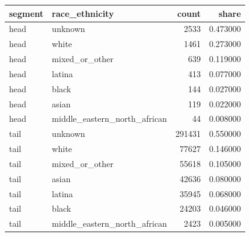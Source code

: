 \begin{tabular}{llrr}
\toprule
segment & race_ethnicity & count & share \\
\midrule
head & unknown & 2533 & 0.473000 \\
head & white & 1461 & 0.273000 \\
head & mixed_or_other & 639 & 0.119000 \\
head & latina & 413 & 0.077000 \\
head & black & 144 & 0.027000 \\
head & asian & 119 & 0.022000 \\
head & middle_eastern_north_african & 44 & 0.008000 \\
tail & unknown & 291431 & 0.550000 \\
tail & white & 77627 & 0.146000 \\
tail & mixed_or_other & 55618 & 0.105000 \\
tail & asian & 42636 & 0.080000 \\
tail & latina & 35945 & 0.068000 \\
tail & black & 24203 & 0.046000 \\
tail & middle_eastern_north_african & 2423 & 0.005000 \\
\bottomrule
\end{tabular}
